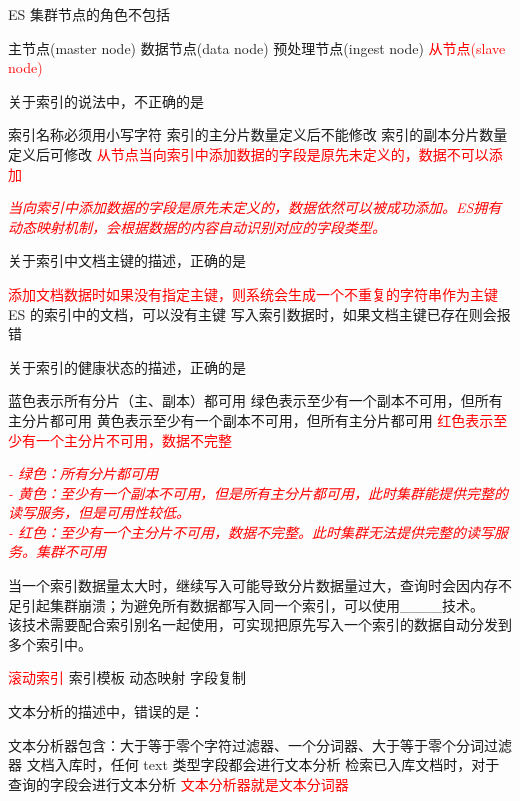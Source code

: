 \documentclass{exam}
\begin{document}
\begin{questions}
\question
ES 集群节点的角色不包括
\begin{choices}
    \choice 主节点(master node)
    \choice 数据节点(data node)
    \choice 预处理节点(ingest node)
    \choice \textcolor{red}{从节点(slave node)}
\end{choices}

\question
关于索引的说法中，不正确的是
\begin{choices}
    \choice 索引名称必须用小写字符
    \choice 索引的主分片数量定义后不能修改
    \choice 索引的副本分片数量定义后可修改
    \choice \textcolor{red}{从节点当向索引中添加数据的字段是原先未定义的，数据不可以添加}
\end{choices}
\textit{\textcolor{red}{当向索引中添加数据的字段是原先未定义的，数据依然可以被成功添加。ES拥有动态映射机制，会根据数据的内容自动识别对应的字段类型。}}

\question
关于索引中文档主键的描述，正确的是
\begin{choices}
    \choice \textcolor{red}{添加文档数据时如果没有指定主键，则系统会生成一个不重复的字符串作为主键}
    \choice ES 的索引中的文档，可以没有主键
    \choice 写入索引数据时，如果文档主键已存在则会报错
\end{choices}

\question
关于索引的健康状态的描述，正确的是
\begin{choices}
    \choice 蓝色表示所有分片（主、副本）都可用
    \choice 绿色表示至少有一个副本不可用，但所有主分片都可用
    \choice 黄色表示至少有一个副本不可用，但所有主分片都可用
    \choice \textcolor{red}{红色表示至少有一个主分片不可用，数据不完整}
\end{choices}
\textit{\textcolor{red}{
- 绿色：所有分片都可用 \\
- 黄色：至少有一个副本不可用，但是所有主分片都可用，此时集群能提供完整的读写服务，但是可用性较低。\\
- 红色：至少有一个主分片不可用，数据不完整。此时集群无法提供完整的读写服务。集群不可用}}

\question
当一个索引数据量太大时，继续写入可能导致分片数据量过大，查询时会因内存不足引起集群崩溃；为避免所有数据都写入同一个索引，可以使用\_\_\_\_技术。\\
该技术需要配合索引别名一起使用，可实现把原先写入一个索引的数据自动分发到多个索引中。
\begin{choices}
    \choice \textcolor{red}{滚动索引}
    \choice 索引模板
    \choice 动态映射
    \choice 字段复制
\end{choices}

\question
文本分析的描述中，错误的是：
\begin{choices}
    \choice 文本分析器包含：大于等于零个字符过滤器、一个分词器、大于等于零个分词过滤器
    \choice 文档入库时，任何 text 类型字段都会进行文本分析
    \choice 检索已入库文档时，对于查询的字段会进行文本分析
    \choice \textcolor{red}{文本分析器就是文本分词器}
\end{choices}


\end{questions}
\end{document}
